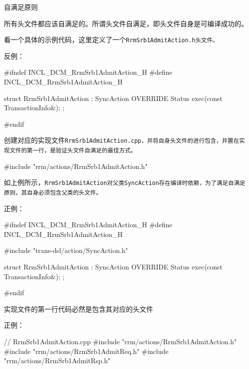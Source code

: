 \begin{content}

\begin{principle}
自满足原则
\end{principle}

所有头文件都应该自满足的。所谓头文件自满足，即头文件自身是可编译成功的。

看一个具体的示例代码，这里定义了一个\tt{RrmSrb1AdmitAction.h}头文件。

反例：
\begin{leftbar}
\begin{c++}
#ifndef INCL_DCM_RrmSrb1AdmitAction_H
#define INCL_DCM_RrmSrb1AdmitAction_H

struct RrmSrb1AdmitAction : SyncAction
{
    OVERRIDE Status exec(const TransactionInfo&);
};

#endif
\end{c++}
\end{leftbar}

创建对应的实现文件\tt{RrmSrb1AdmitAction.cpp}，并将自身头文件的进行包含，并置在实现文件的第一行，是验证头文件自满足的最佳方式。

\begin{leftbar}
\begin{c++}
#include "rrm/actions/RrmSrb1AdmitAction.h"
\end{c++}
\end{leftbar}

如上例所示，\tt{RrmSrb1AdmitAction}对父类\tt{SyncAction}存在编译时依赖，为了满足自满足原则，其自身必须包含父类的头文件。

正例：
\begin{leftbar}
\begin{c++}
#ifndef INCL_DCM_RrmSrb1AdmitAction_H
#define INCL_DCM_RrmSrb1AdmitAction_H

#include "trans-dsl/action/SyncAction.h"

struct RrmSrb1AdmitAction : SyncAction
{
    OVERRIDE Status exec(const TransactionInfo&);
};

#endif
\end{c++}
\end{leftbar}

\begin{regulation}
实现文件的第一行代码必然是包含其对应的头文件
\end{regulation}

正例：
\begin{leftbar}
\begin{c++}
// RrmSrb1AdmitAction.cpp
#include "rrm/actions/RrmSrb1AdmitAction.h"
#include "rrm/actions/RrmSrb1AdmitReq.h"
#include "rrm/actions/RrmSrb1AdmitRsp.h"
\end{c++}
\end{leftbar}


\end{content}
